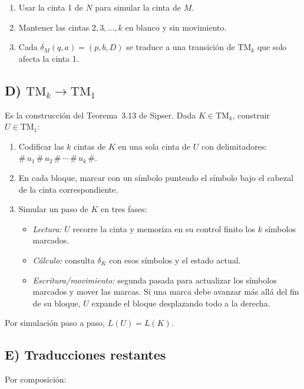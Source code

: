 \documentclass[11pt,a4paper]{article}
\theoremstyle{plain}
\theoremstyle{definition}
\theoremstyle{remark}
\newcommand{\TM}{\mathrm{TM}}
\newcommand{\TMone}{\TM_{1}}
\newcommand{\TMk}{\TM_{k}}
\begin{document}
\begin{enumerate}
  \item Usar la cinta 1 de $N$ para simular la cinta de $M$.
  \item Mantener las cintas $2,3,\dots,k$ en blanco y sin movimiento.
  \item Cada $\delta_M(q,a)=(p,b,D)$ se traduce a una transici\'on de
        $\TMk$ que solo afecta la cinta 1.
\end{enumerate}

\subsection*{D) $\TMk \to \TMone$}

Es la construcci\'on del Teorema~3.13 de Sipser. Dada $K\in\TMk$, construir
$U\in\TMone$:

\begin{enumerate}
  \item Codificar las $k$ cintas de $K$ en una sola cinta de $U$ con
        delimitadores: $\#\,u_1\,\#\,u_2\,\#\,\cdots\,\#\,u_k\,\#$.
  \item En cada bloque, marcar con un s\'imbolo punteado el s\'imbolo bajo
        el cabezal de la cinta correspondiente.
  \item Simular un paso de $K$ en tres fases:
        \begin{itemize}
          \item \emph{Lectura:} $U$ recorre la cinta y memoriza en su control
                finito los $k$ s\'imbolos marcados.
          \item \emph{C\'alculo:} consulta $\delta_K$ con esos s\'imbolos y
                el estado actual.
          \item \emph{Escritura/movimiento:} segunda pasada para actualizar
                los s\'imbolos marcados y mover las marcas. Si una marca
                debe avanzar m\'as all\'a del fin de su bloque, $U$ expande
                el bloque desplazando todo a la derecha.
        \end{itemize}
\end{enumerate}

Por simulaci\'on paso a paso, $L(U)=L(K)$.

\subsection*{E) Traducciones restantes}

Por composici\'on:
\end{document}
